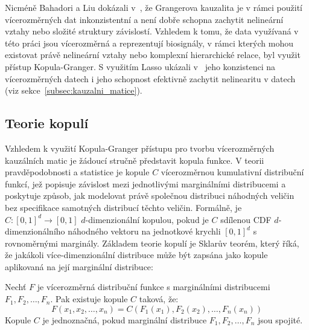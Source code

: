Nicméně Bahadori a Liu dokázali v~\cite{Bahadori2013}, že Grangerova kauzalita
je v rámci použití vícerozměrných dat inkonzistentní a není dobře schopna
zachytit nelineární vztahy nebo složité struktury závislostí. Vzhledem k tomu,
že data využívaná v této práci jsou vícerozměrná a reprezentují biosignály, v
rámci kterých mohou existovat právě nelineární vztahy nebo komplexní
hierarchické relace, byl využit přístup Kopula-Granger. S využitím Lasso ukázali
v~\cite{Bahadori2013} jeho konzistenci na vícerozměrných datech i jeho schopnost
efektivně zachytit nelinearitu v datech (viz
sekce~\ref{subsec:kauzalni_matice}).

\subsection{Teorie kopulí}
\label{subsec:teorie_kopul}
Vzhledem k využití Kopula-Granger přístupu pro tvorbu vícerozměrných kauzálních
matic je žádoucí stručně představit kopula funkce. V teorii pravděpodobnosti a
statistice je kopule $C$ vícerozměrnou kumulativní distribuční funkcí, jež
popisuje závislost mezi jednotlivými marginálními distribucemi a poskytuje
způsob, jak modelovat právě společnou distribuci náhodných veličin bez
specifikace samotných distribucí těchto veličin. Formálně, je
$C:[0,1]^{d}\rightarrow [0,1]$ $d$-dimenzionální kopulou, pokud je $C$ sdílenou
\gls{CDF} $d$-dimenzionálního náhodného vektoru na jednotkové krychli
$[0,1]^{d}$ s rovnoměrnými marginály. Základem teorie kopulí je Sklarův teorém,
který říká, že jakákoli více-dimenzionální distribuce může být zapsána jako
kopule aplikovaná na její marginální distribuce:

\begin{theorem}
    \label{theorem:sklar}
    Nechť $F$ je vícerozměrná distribuční funkce s marginálními distribucemi
    $F_1, F_2, \ldots, F_n$. Pak existuje kopule $C$ taková, že:
    \begin{equation}
        F\left(x_1, x_2, \ldots, x_n\right)=C\left(F_1\left(x_1\right), F_2\left(x_2\right), \ldots, F_n\left(x_n\right)\right)
    \end{equation}
    Kopule $C$ je jednoznačná, pokud marginální distribuce $F_1, F_2, \ldots, F_n$ jsou spojité.
\end{theorem}

